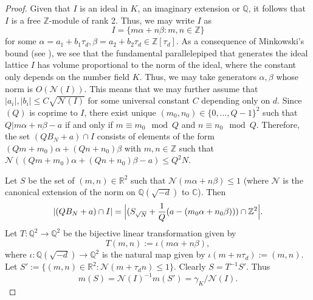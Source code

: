 \documentclass[11pt]{amsart}
\theoremstyle{definition}
\newcommand{\C}{{\mathbb C}}
\newcommand{\NN}{{\mathcal N}}
\newcommand{\Q}{{\mathbb Q}}
\newcommand{\R}{{\mathbb R}}
\newcommand{\Z}{{\mathbb Z}}
\newcommand{\FM}[1]{{\color{violet}{{#1}}}}
\begin{document}
\begin{proof}
 Given that $I$ is an ideal in $K$, an imaginary extension or $\Q$, it follows that $I$ is a free $\Z$-module of rank 2. Thus, we may write $I$ as 
     $$I=\{m\alpha+n\beta\colon m,n\in\Z\}$$
     for some $\alpha=a_{1}+b_{1}\tau_{d},\beta=a_{2}+b_{2}\tau_{d}\in\Z[\tau_{d}]$. As a consequence of Minkowski's bound (see \cite[Theorems 6.6 and 7.4]{neukirch99}), we see that the fundamental parallelepiped that generates the ideal lattice $I$ has volume proportional to the norm of the ideal, where the constant only depends on the number field $K$. Thus, we may take generators $\alpha, \beta$ whose norm is $O(\NN(I))$. %
     This means that we may further assume that $\vert a_{i}\vert, \vert b_{i}\vert\leq C\sqrt{\NN(I)}$ for some universal constant $C$ depending only on $d$. %
     Since $(Q)$ is coprime to $I$, there exist unique $(m_{0},n_{0})\in\{0,\dots,Q-1\}^{2}$ such that $Q\vert m\alpha+n\beta-a$ if and only if $m\equiv m_{0} \mod Q$ and $n\equiv n_{0} \mod Q$.
     Therefore, the set $(QB_{N}+a)\cap I$ consists of elements of the form $(Qm+m_{0})\alpha+(Qn+n_{0})\beta$ with $m,n\in\Z$ such that $\NN((Qm+m_{0})\alpha+(Qn+n_{0})\beta-a)\leq Q^{2}N$.
     


      
      Let $S$ be the set of $(m,n)\in\R^{2}$ such that $\NN(m\alpha+n\beta)\leq 1$ (where $\NN$ is the canonical extension of the norm on $\Q(\sqrt{-d})$ to $\C$). Then 
     $$\vert (QB_{N}+a)\cap I\vert=\Bigl\vert (S_{\sqrt{N}}+\frac{1}{Q}(a-(m_{0}\alpha+n_{0}\beta)))\cap\Z^{2}\Bigr\vert.$$ Let $T\colon \Q^{2}\to\Q^{2}$ be the bijective linear transformation given by 
      $$T(m,n):=\iota(m\alpha+n\beta),$$
      where $\iota\colon\Q(\sqrt{-d})\to\Q^{2}$ is the natural map given by $\iota(m+n\tau_{d}):=(m,n)$.
      Let $S':=\{(m,n)\in\R^{2}\colon \NN(m+\tau_{d} n)\leq 1\}$. Clearly $S=T^{-1}S'$.
      Thus 
      $$m(S)=\NN(I)^{-1}m(S')=\gamma_{K}/\NN(I).$$
      

\end{proof}
\end{document}
